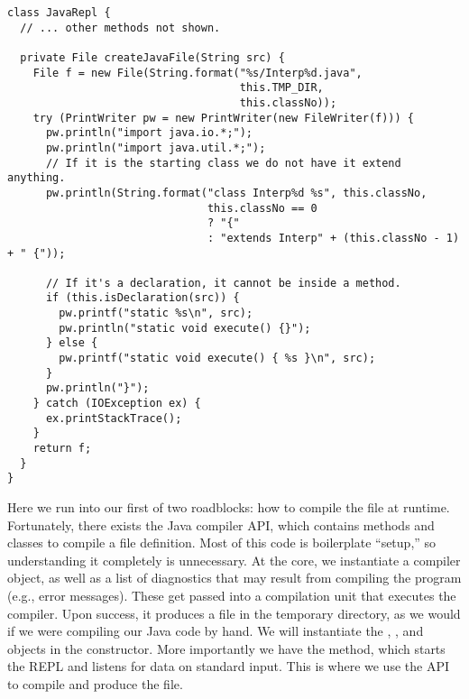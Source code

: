\begin{lstlisting}[language=MyJava]
class JavaRepl {
  // ... other methods not shown.
  
  private File createJavaFile(String src) {
    File f = new File(String.format("%s/Interp%d.java",
                                    this.TMP_DIR, 
                                    this.classNo));
    try (PrintWriter pw = new PrintWriter(new FileWriter(f))) {
      pw.println("import java.io.*;");
      pw.println("import java.util.*;");
      // If it is the starting class we do not have it extend anything.
      pw.println(String.format("class Interp%d %s", this.classNo,
                               this.classNo == 0
                               ? "{" 
                               : "extends Interp" + (this.classNo - 1) + " {"));

      // If it's a declaration, it cannot be inside a method.
      if (this.isDeclaration(src)) {
        pw.printf("static %s\n", src);
        pw.println("static void execute() {}");
      } else {
        pw.printf("static void execute() { %s }\n", src);
      }
      pw.println("}");
    } catch (IOException ex) {
      ex.printStackTrace();
    }
    return f;
  }
}
\end{lstlisting}

Here we run into our first of two roadblocks: how to compile the file at runtime. Fortunately, there exists the Java compiler API, which contains methods and classes to compile a file definition. Most of this code is boilerplate ``setup,'' so understanding it completely is unnecessary. At the core, we instantiate a compiler object, as well as a list of diagnostics that may result from compiling the program (e.g., error messages). These get passed into a compilation unit that executes the compiler. Upon success, it produces a  file in the temporary directory, as we would if we were compiling our Java code by hand. We will instantiate the , , and  objects in the constructor. More importantly we have the  method, which starts the REPL and listens for data on standard input. This is where we use the API to compile and produce the  file.   

